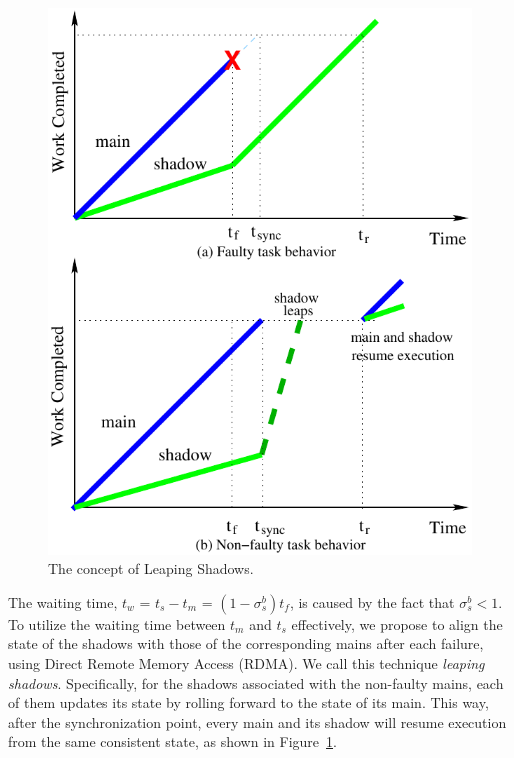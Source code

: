 \begin{figure}[!t]
	\begin{center}
			\includegraphics[width=0.8\columnwidth]{Figures/jump.pdf}
	\end{center}
	\vskip -0.25in
	\caption{The concept of Leaping Shadows.}
	\label{fig:leap}
\end{figure}

The waiting time, $t_w$ = $t_s - t_m$ = $(1-\sigma_s^b)t_f$, is caused by the fact that $\sigma_s^b < 1$. To utilize the waiting time between $t_m$ and $t_s$ effectively, we propose to align the state of the shadows with those of the corresponding mains after each failure, using Direct Remote Memory Access (RDMA). We call this technique \emph{leaping shadows}. Specifically, for the shadows associated with the non-faulty mains, each of them updates its state by rolling forward to the state of its main. This way, after the synchronization point, every main and its shadow will resume execution from the same consistent state, as shown in Figure~\ref{fig:leap}.  %
